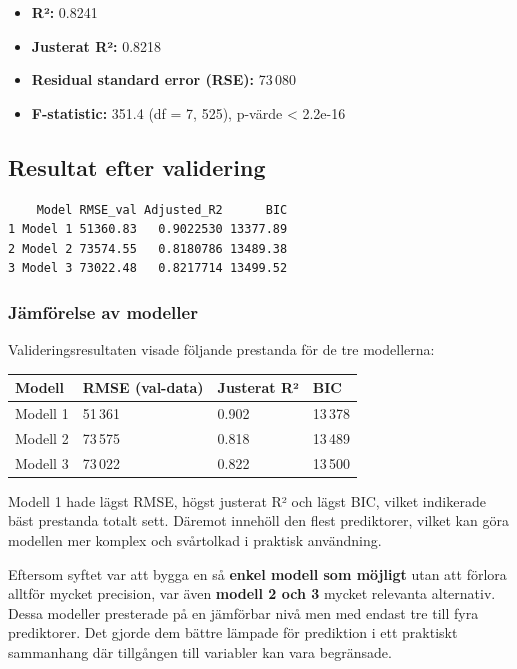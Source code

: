 \documentclass[
  letterpaper,
  DIV=11,
  numbers=noendperiod]{scrreprt}
\providecommand{\tightlist}{%
  \setlength{\itemsep}{0pt}\setlength{\parskip}{0pt}}\usepackage{longtable,booktabs,array}
\begin{document}
\begin{itemize}
\tightlist
\item
  \textbf{R²:} 0.8241
\item
  \textbf{Justerat R²:} 0.8218
\item
  \textbf{Residual standard error (RSE):} 73\,080
\item
  \textbf{F-statistic:} 351.4 (df = 7, 525), p-värde \textless{} 2.2e-16
\end{itemize}

\subsection{Resultat efter validering}\label{resultat-efter-validering}

\begin{verbatim}
    Model RMSE_val Adjusted_R2      BIC
1 Model 1 51360.83   0.9022530 13377.89
2 Model 2 73574.55   0.8180786 13489.38
3 Model 3 73022.48   0.8217714 13499.52
\end{verbatim}

\subsubsection{Jämförelse av
modeller}\label{juxe4mfuxf6relse-av-modeller}

Valideringsresultaten visade följande prestanda för de tre modellerna:

\begin{longtable}[]{@{}llll@{}}
\toprule\noalign{}
Modell & RMSE (val-data) & Justerat R² & BIC \\
\midrule\noalign{}
\endhead
\bottomrule\noalign{}
\endlastfoot
Modell 1 & 51\,361 & 0.902 & 13\,378 \\
Modell 2 & 73\,575 & 0.818 & 13\,489 \\
Modell 3 & 73\,022 & 0.822 & 13\,500 \\
\end{longtable}

Modell 1 hade lägst RMSE, högst justerat R² och lägst BIC, vilket
indikerade bäst prestanda totalt sett. Däremot innehöll den flest
prediktorer, vilket kan göra modellen mer komplex och svårtolkad i
praktisk användning.

Eftersom syftet var att bygga en så \textbf{enkel modell som möjligt}
utan att förlora alltför mycket precision, var även \textbf{modell 2 och
3} mycket relevanta alternativ. Dessa modeller presterade på en
jämförbar nivå men med endast tre till fyra prediktorer. Det gjorde dem
bättre lämpade för prediktion i ett praktiskt sammanhang där tillgången
till variabler kan vara begränsade.
\end{document}
